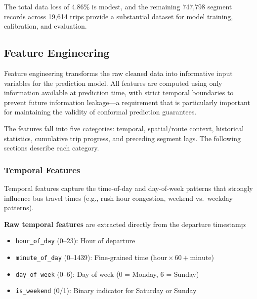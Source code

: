 The total data loss of 4.86\% is modest, and the remaining 747,798 segment records across 19,614 trips provide a substantial dataset for model training, calibration, and evaluation.

\subsection{Feature Engineering}
\label{subsec:feature_engineering}

Feature engineering transforms the raw cleaned data into informative input variables for the prediction model. All features are computed using only information available at prediction time, with strict temporal boundaries to prevent future information leakage—a requirement that is particularly important for maintaining the validity of conformal prediction guarantees.

The features fall into five categories: temporal, spatial/route context, historical statistics, cumulative trip progress, and preceding segment lags. The following sections describe each category.

\subsubsection{Temporal Features}
\label{subsubsec:temporal_features}

Temporal features capture the time-of-day and day-of-week patterns that strongly influence bus travel times (e.g., rush hour congestion, weekend vs.\ weekday patterns).

\textbf{Raw temporal features} are extracted directly from the departure timestamp:
\begin{itemize}
    \item \texttt{hour\_of\_day} (0--23): Hour of departure
    \item \texttt{minute\_of\_day} (0--1439): Fine-grained time ($\text{hour} \times 60 + \text{minute}$)
    \item \texttt{day\_of\_week} (0--6): Day of week (0 = Monday, 6 = Sunday)
    \item \texttt{is\_weekend} (0/1): Binary indicator for Saturday or Sunday
\end{itemize}

